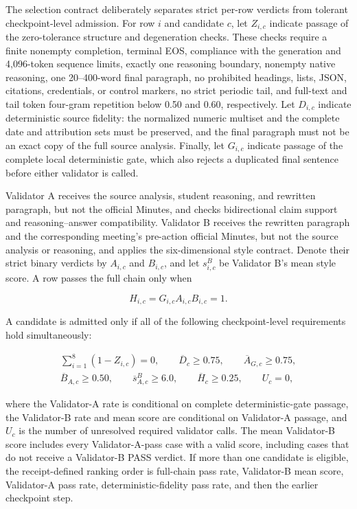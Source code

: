 The selection contract deliberately separates strict per-row verdicts from
tolerant checkpoint-level admission. For row \(i\) and candidate \(c\), let
\(Z_{i,c}\) indicate passage of the zero-tolerance structure and degeneration
checks. These checks require a finite nonempty completion, terminal EOS,
compliance with the generation and 4,096-token sequence limits, exactly one
reasoning boundary, nonempty native reasoning, one 20--400-word final
paragraph, no prohibited headings, lists, JSON, citations, credentials, or
control markers, no strict periodic tail, and full-text and tail token
four-gram repetition below 0.50 and 0.60, respectively. Let \(D_{i,c}\)
indicate deterministic source fidelity: the normalized numeric multiset and
the complete date and attribution sets must be preserved, and the final
paragraph must not be an exact copy of the full source analysis. Finally, let
\(G_{i,c}\) indicate passage of the complete local deterministic gate, which
also rejects a duplicated final sentence before either validator is called.

Validator A receives the source analysis, student reasoning, and rewritten
paragraph, but not the official Minutes, and checks bidirectional claim support
and reasoning--answer compatibility. Validator B receives the rewritten
paragraph and the corresponding meeting's pre-action official Minutes, but not
the source analysis or reasoning, and applies the six-dimensional style
contract. Denote their strict binary verdicts by \(A_{i,c}\) and \(B_{i,c}\),
and let \(s^B_{i,c}\) be Validator B's mean style score. A row passes the full
chain only when

\[
    H_{i,c}=G_{i,c}A_{i,c}B_{i,c}=1.
\]

A candidate is admitted only if all of the following checkpoint-level
requirements hold simultaneously:

\[
\begin{gathered}
    \sum_{i=1}^{8}(1-Z_{i,c})=0,
    \qquad \overline{D}_{c}\geq 0.75,
    \qquad \overline{A}_{G,c}\geq 0.75, \\
    \overline{B}_{A,c}\geq 0.50,
    \qquad \overline{s}^{B}_{A,c}\geq 6.0,
    \qquad \overline{H}_{c}\geq 0.25,
    \qquad U_c=0,
\end{gathered}
\]

where the Validator-A rate is conditional on complete deterministic-gate passage,
the Validator-B rate and mean score are conditional on Validator-A passage,
and \(U_c\) is the number of unresolved required validator calls. The mean
Validator-B score includes every Validator-A-pass case with a valid score,
including cases that do not receive a Validator-B PASS verdict. If more than
one candidate is eligible, the receipt-defined ranking order is full-chain pass rate,
Validator-B mean score, Validator-A pass rate, deterministic-fidelity pass
rate, and then the earlier checkpoint step.

